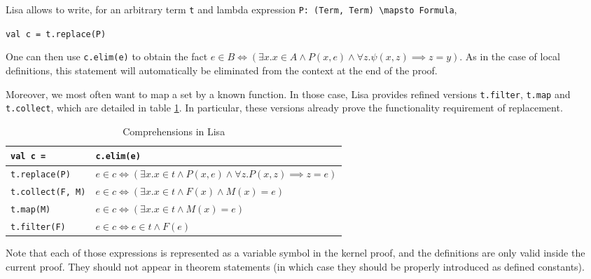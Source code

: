 Lisa allows to write, for an arbitrary term \lstinline|t| and lambda expression \lstinline|P: (Term, Term) \mapsto Formula|,
\begin{center}
  \lstinline|val c = t.replace(P)|
\end{center}
One can then use \lstinline|c.elim(e)| to obtain the fact 
$e \in B \iff (\exists x. x \in A \land P(x, e) \land \forall z. \psi(x, z) \implies z = y)$. As in the case of local definitions, this statement will automatically be eliminated from the context at the end of the proof.

Moreover, we most often want to map a set by a known function. In those case, Lisa provides refined versions \lstinline|t.filter|, \lstinline|t.map| and \lstinline|t.collect|, which are detailed in table \ref{tab:comprehensions}. In particular, these versions already prove the functionality requirement of replacement.
\begin{table}[h]
  \begin{tabular}{l|l}
    \textbf{\lstinline|val c = |} & \textbf{\lstinline|c.elim(e)|} \\ \hline
    \lstinline|t.replace(P)| & $e \in c \iff (\exists x. x \in t \land P(x, e) \land ∀ z. P(x, z) \implies z = e)$ \\
    \lstinline|t.collect(F, M)| & $e \in c \iff (\exists x. x \in t \land F(x) \land M(x) = e)$ \\
    \lstinline|t.map(M)| & $e \in c \iff (\exists x. x \in t \land M(x) = e)$ \\
    \lstinline|t.filter(F)| & $e \in c \iff e \in t \land F(e)$ \\   
  \end{tabular}
  \caption{Comprehensions in Lisa}
  \label{tab:comprehensions}
\end{table}

Note that each of those expressions is represented as a variable symbol in the kernel proof, and the definitions are only valid inside the current proof. They should not appear in theorem statements (in which case they should be properly introduced as defined constants).
